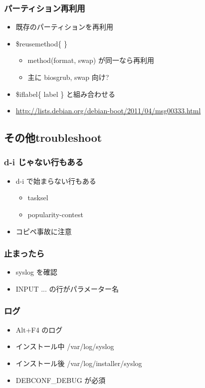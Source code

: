 \documentclass[mingoth,a4paper]{jsarticle}
\begin{document}
\subsubsection{パーティション再利用}
\begin{itemize}
\item 既存のパーティションを再利用
\item \$reusemethod\{ \}
  \begin{itemize}
  \item method(format, swap) が同一なら再利用
  \item 主に biosgrub, swap 向け?
  \end{itemize}
\item \$iflabel\{ label \} と組み合わせる
\item \url{http://lists.debian.org/debian-boot/2011/04/msg00333.html}
\end{itemize}

\subsection{その他troubleshoot}
\subsubsection{d-i じゃない行もある}
\begin{itemize}
\item d-i で始まらない行もある
  \begin{itemize}
  \item tasksel
  \item popularity-contest
  \end{itemize}
\item コピペ事故に注意
\end{itemize}

\subsubsection{止まったら}
\begin{itemize}
\item syslog を確認
\item INPUT ... の行がパラメーター名
\end{itemize}

\subsubsection{ログ}
\begin{itemize}
\item Alt+F4 のログ
\item インストール中 /var/log/syslog
\item インストール後 /var/log/installer/syslog
\item DEBCONF\_DEBUG が必須
\end{itemize}
\end{document}
